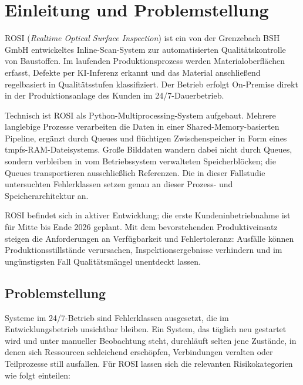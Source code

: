 
\section{Einleitung und Problemstellung}
\label{sec:einleitung}

ROSI (\textit{Realtime Optical Surface Inspection}) ist ein von der Grenzebach BSH GmbH
entwickeltes Inline-Scan-System zur automatisierten Qualitätskontrolle von Baustoffen.
Im laufenden Produktionsprozess werden Materialoberflächen erfasst, Defekte per
KI-Inferenz erkannt und das Material anschließend regelbasiert in Qualitätsstufen
klassifiziert. Der Betrieb erfolgt On-Premise direkt in der Produktionsanlage des
Kunden im 24/7-Dauerbetrieb.

Technisch ist ROSI als Python-Multiprocessing-System aufgebaut. Mehrere langlebige
Prozesse verarbeiten die Daten in einer Shared-Memory-basierten Pipeline, ergänzt durch
Queues und flüchtigen Zwischenspeicher in Form eines tmpfs-RAM-Dateisystems. Große
Bilddaten wandern dabei nicht durch Queues, sondern verbleiben in vom Betriebssystem
verwalteten Speicherblöcken; die Queues transportieren ausschließlich Referenzen. Die
in dieser Fallstudie untersuchten Fehlerklassen setzen genau an dieser Prozess- und
Speicherarchitektur an.

ROSI befindet sich in aktiver Entwicklung; die erste Kundeninbetriebnahme ist für Mitte
bis Ende 2026 geplant. Mit dem bevorstehenden Produktiveinsatz steigen die Anforderungen
an Verfügbarkeit und Fehlertoleranz: Ausfälle können Produktionsstillstände
verursachen, Inspektionsergebnisse verhindern und im ungünstigsten Fall Qualitätsmängel
unentdeckt lassen.

\subsection{Problemstellung}
\label{sec:problemstellung}

Systeme im 24/7-Betrieb sind Fehlerklassen ausgesetzt, die im Entwicklungsbetrieb
unsichtbar bleiben. Ein System, das täglich neu gestartet wird und unter manueller
Beobachtung steht, durchläuft selten jene Zustände, in denen sich Ressourcen schleichend
erschöpfen, Verbindungen veralten oder Teilprozesse still ausfallen. Für ROSI lassen
sich die relevanten Risikokategorien wie folgt einteilen:

